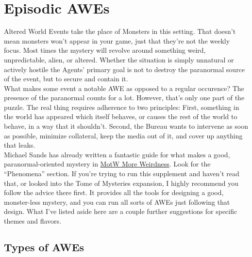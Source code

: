 \documentclass[10pt,oneside,landscape]{memoir}
\begin{document}
\begin{multicols}{2}
\section*{Episodic AWEs}
Altered World Events take the place of Monsters in this setting.  That doesn’t mean monsters won’t appear in your game, just that they're not the weekly focus.  Most times the mystery will revolve around something weird, unpredictable, alien, or altered.  Whether the situation is simply unnatural or actively hostile the Agents’ primary goal is not to destroy the paranormal source of the event, but to secure and contain it.
\\[4mm]
What makes some event a notable AWE as opposed to a regular occurence?  The presence of the paranormal counts for a lot.  However, that's only one part of the puzzle.  The real thing requires adherence to two principles:  First, something in the world has appeared which itself behaves, or causes the rest of the world to behave, in a way that it shouldn’t.  Second, the Bureau wants to intervene as soon as possible, minimize collateral, keep the media out of it, and cover up anything that leaks.  
\\[4mm]
Michael Sands has already written a fantastic guide for what makes a good, paranormal-oriented mystery in \href{https://genericgames.co.nz/files/MotW_more_weirdness.pdf}{MotW More Weirdness}.  Look for the “Phenomena” section.  If you’re trying to run this supplement and haven’t read that, or looked into the Tome of Mysteries expansion, I highly recommend you follow the advice there first.  It provides all the tools for designing a good, monster-less mystery, and you can run all sorts of AWEs just following that design.  What I’ve listed aside here are a couple further suggestions for specific themes and flavors.
%
\begin{tcolorbox}[bottom=4mm]
\section*{Types of AWEs}
\begin{itemize}[leftmargin=*,parsep=1mm]


\end{itemize}
\end{tcolorbox}
\end{multicols}
\end{document}
